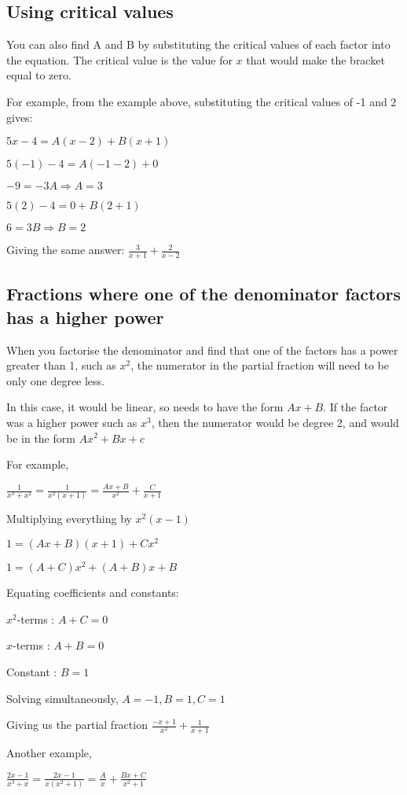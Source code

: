\documentclass[../main.tex]{subfiles}
\begin{document}
\subsection*{Using critical values}
You can also find A and B by substituting the critical values of each factor into the equation. The critical value is the value for $x$ that would make the bracket equal to zero.

For example, from the example above, substituting the critical values of -1 and 2 gives:

$5x-4=A(x-2)+B(x+1)$

$5(-1)-4=A(-1-2)+0$

$-9=-3A \Rightarrow A=3$

$5(2)-4=0+B(2+1)$

$6=3B \Rightarrow B=2$

Giving the same answer: $\frac{3}{x+1}+\frac{2}{x-2}$

\subsection*{Fractions where one of the denominator factors has a higher power}

When you factorise the denominator and find that one of the factors has a power greater than 1, such as $x^2$, the numerator in the partial fraction will need to be only one degree less. 

In this case, it would be linear, so needs to have the form $Ax + B$.
If the factor was a higher power such as $x^3$, then the numerator would be degree 2, and would be in the form $Ax^2+Bx+c$

For example,

$\frac{1}{x^3+x^2}=\frac{1}{x^2(x+1)}=\frac{Ax+B}{x^2}+\frac{C}{x+1}$

Multiplying everything by $x^2(x-1)$

$1=(Ax+B)(x+1)+Cx^2$

$1=(A+C)x^2+(A+B)x+B$

Equating coefficients and constants:

$x^2$-terms : $A+C=0$

$x$-terms : $A+B=0$

Constant : $B=1$

Solving simultaneously, $A=-1, B=1, C=1$

Giving us the partial fraction $\frac{-x+1}{x^2}+\frac{1}{x+1}$

Another example,

$\frac{2x-1}{x^3+x}=\frac{2x-1}{x(x^2+1)}=\frac{A}{x}+\frac{Bx+C}{x^2+1}$
\end{document}
